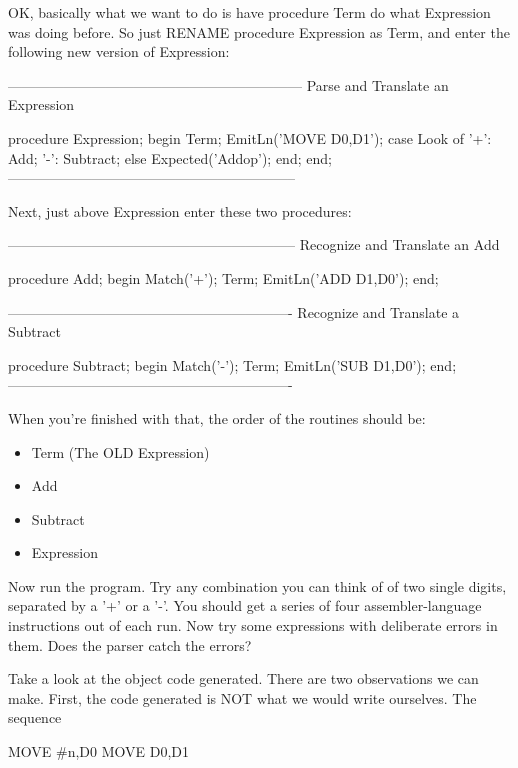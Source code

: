 \documentclass[float=false, crop=false]{standalone}
\begin{document}
OK, basically what we want to do is have procedure Term do what Expression was
doing before. So just RENAME procedure Expression as Term, and enter the
following new version of Expression:

\begin{code}
{---------------------------------------------------------------}
{ Parse and Translate an Expression }

procedure Expression;
begin
   Term;
   EmitLn('MOVE D0,D1');
   case Look of
    '+': Add;
    '-': Subtract;
   else Expected('Addop');
   end;
end;
{--------------------------------------------------------------}
\end{code}

Next, just above Expression enter these two procedures:

\begin{code}
{--------------------------------------------------------------}
{ Recognize and Translate an Add }

procedure Add;
begin
   Match('+');
   Term;
   EmitLn('ADD D1,D0');
end;


{-------------------------------------------------------------}
{ Recognize and Translate a Subtract }

procedure Subtract;
begin
   Match('-');
   Term;
   EmitLn('SUB D1,D0');
end;
{-------------------------------------------------------------}
\end{code}

When you're finished with that,  the order of the routines should
be:

\begin{itemize}
\item Term (The OLD Expression)
\item Add
\item Subtract
\item Expression
\end{itemize}

Now run the program.  Try any combination you can think of of two
single digits,  separated  by  a  '+' or a '-'.  You should get a
series of four assembler-language instructions out  of  each run.
Now  try  some  expressions with deliberate errors in them.  Does
the parser catch the errors?

Take a look at the object code generated. There are two observations we can
make. First, the code generated is NOT what we would write ourselves. The
sequence

        MOVE #n,D0
        MOVE D0,D1
\end{document}
